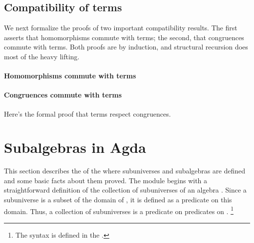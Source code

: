 \documentclass[a4paper,USenglish,cleveref,autoref,thm-restate]{lipics-v2019}
\begin{document}
\subsection{Compatibility of terms}
We next formalize the proofs of two important compatibility results. The first asserts that homomorphisms commute with terms; the second, that congruences commute with terms.  Both proofs are by induction, and structural recursion does most of the heavy lifting.
\paragraph*{Homomorphisms commute with terms}\label{sec:homomorphisms-commute-with-terms}
\begin{code}\end{code}

\paragraph*{Congruences commute with terms}\label{sec:congruences-commute-with-terms}
Here's the formal proof that terms respect congruences.
\begin{code}\end{code}



\section{Subalgebras in Agda}\label{sec:sec:subs-in-agda}
This section describes the \subsmodule of the \agdaualib where subuniverses and subalgebras are defined and some basic facts about them proved. The module begins with a straightforward definition of the collection of subuniverses of an algebra \algA. Since a subuniverse is a subset of the domain \univA of \algA, it is defined as a predicate on this domain. Thus, a collection of subuniverses is a predicate on predicates on \univA.%
\footnote{The syntax \AgdaSpace{} is defined in the \preludemodule.}
\begin{code}\end{code}
\end{document}
